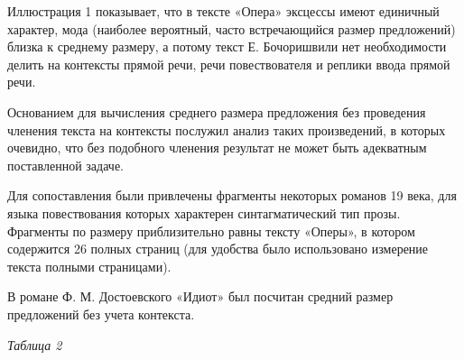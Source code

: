 \documentclass{kursa4}
\begin{document}
    \bigskip


    \bigskip

    {Иллюстрация 1 показывает, что в тексте «Опера»
    эксцессы имеют единичный характер, мода (наиболее вероятный, часто
    встречающийся размер предложений) близка к среднему размеру, а потому
    текст Е. Бочоришвили нет необходимости делить на контексты прямой речи,
    речи повествователя и реплики ввода прямой речи. }

    {Основанием для вычисления среднего размера
    предложения без проведения членения текста на контексты послужил
    анализ таких произведений, в которых очевидно, что без подобного
    членения результат не может быть адекватным поставленной задаче. }

    {Для сопоставления были привлечены фрагменты
    некоторых романов 19 века, для языка повествования которых характерен
    синтагматический тип прозы. Фрагменты по размеру приблизительно равны
    тексту «Оперы», в котором содержится 26 полных страниц (для удобства
    было использовано измерение текста полными страницами). }

    {В романе Ф. М. Достоевского «Идиот» был посчитан
    средний размер }{предложений без учета контекста. }

    {\centering
    \textit{{Таблица 2}}
    \par}
\end{document}
